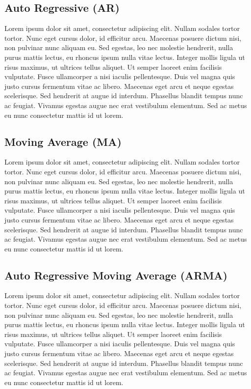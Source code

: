 \subsection{Auto Regressive (AR)}
Lorem ipsum dolor sit amet, consectetur adipiscing elit. Nullam sodales tortor tortor. Nunc eget cursus dolor, id efficitur arcu. Maecenas posuere dictum nisi, non pulvinar nunc aliquam eu. Sed egestas, leo nec molestie hendrerit, nulla purus mattis lectus, eu rhoncus ipsum nulla vitae lectus. Integer mollis ligula ut risus maximus, ut ultrices tellus aliquet. Ut semper laoreet enim facilisis vulputate. Fusce ullamcorper a nisi iaculis pellentesque. Duis vel magna quis justo cursus fermentum vitae ac libero. Maecenas eget arcu et neque egestas scelerisque. Sed hendrerit at augue id interdum. Phasellus blandit tempus nunc ac feugiat. Vivamus egestas augue nec erat vestibulum elementum. Sed ac metus eu nunc consectetur mattis id ut lorem.

\subsection{Moving Average (MA)}
Lorem ipsum dolor sit amet, consectetur adipiscing elit. Nullam sodales tortor tortor. Nunc eget cursus dolor, id efficitur arcu. Maecenas posuere dictum nisi, non pulvinar nunc aliquam eu. Sed egestas, leo nec molestie hendrerit, nulla purus mattis lectus, eu rhoncus ipsum nulla vitae lectus. Integer mollis ligula ut risus maximus, ut ultrices tellus aliquet. Ut semper laoreet enim facilisis vulputate. Fusce ullamcorper a nisi iaculis pellentesque. Duis vel magna quis justo cursus fermentum vitae ac libero. Maecenas eget arcu et neque egestas scelerisque. Sed hendrerit at augue id interdum. Phasellus blandit tempus nunc ac feugiat. Vivamus egestas augue nec erat vestibulum elementum. Sed ac metus eu nunc consectetur mattis id ut lorem.

\subsection{Auto Regressive Moving Average (ARMA)}
Lorem ipsum dolor sit amet, consectetur adipiscing elit. Nullam sodales tortor tortor. Nunc eget cursus dolor, id efficitur arcu. Maecenas posuere dictum nisi, non pulvinar nunc aliquam eu. Sed egestas, leo nec molestie hendrerit, nulla purus mattis lectus, eu rhoncus ipsum nulla vitae lectus. Integer mollis ligula ut risus maximus, ut ultrices tellus aliquet. Ut semper laoreet enim facilisis vulputate. Fusce ullamcorper a nisi iaculis pellentesque. Duis vel magna quis justo cursus fermentum vitae ac libero. Maecenas eget arcu et neque egestas scelerisque. Sed hendrerit at augue id interdum. Phasellus blandit tempus nunc ac feugiat. Vivamus egestas augue nec erat vestibulum elementum. Sed ac metus eu nunc consectetur mattis id ut lorem.

